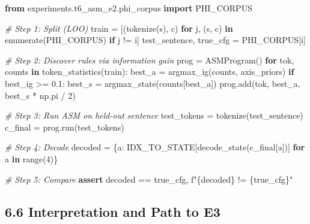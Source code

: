 \documentclass[
  twocolumn,
  10pt,
  a4paper]{article}
\newenvironment{Shaded}{}{}
\newcommand{\BuiltInTok}[1]{\textcolor[rgb]{0.00,0.50,0.00}{#1}}
\newcommand{\CommentTok}[1]{\textcolor[rgb]{0.38,0.63,0.69}{\textit{#1}}}
\newcommand{\ControlFlowTok}[1]{\textcolor[rgb]{0.00,0.44,0.13}{\textbf{#1}}}
\newcommand{\DecValTok}[1]{\textcolor[rgb]{0.25,0.63,0.44}{#1}}
\newcommand{\FloatTok}[1]{\textcolor[rgb]{0.25,0.63,0.44}{#1}}
\newcommand{\ImportTok}[1]{\textcolor[rgb]{0.00,0.50,0.00}{\textbf{#1}}}
\newcommand{\KeywordTok}[1]{\textcolor[rgb]{0.00,0.44,0.13}{\textbf{#1}}}
\newcommand{\NormalTok}[1]{#1}
\newcommand{\OperatorTok}[1]{\textcolor[rgb]{0.40,0.40,0.40}{#1}}
\newcommand{\SpecialCharTok}[1]{\textcolor[rgb]{0.25,0.44,0.63}{#1}}
\newcommand{\SpecialStringTok}[1]{\textcolor[rgb]{0.73,0.40,0.53}{#1}}
\begin{document}
\begin{Shaded}
\begin{Highlighting}[]
\ImportTok{from}\NormalTok{ experiments.t6\_asm\_e2.phi\_corpus }\ImportTok{import}\NormalTok{ PHI\_CORPUS}

\CommentTok{\# Step 1: Split (LOO)}
\NormalTok{train }\OperatorTok{=}\NormalTok{ [(tokenize(s), c) }\ControlFlowTok{for}\NormalTok{ j, (s, c) }\KeywordTok{in} \BuiltInTok{enumerate}\NormalTok{(PHI\_CORPUS) }\ControlFlowTok{if}\NormalTok{ j }\OperatorTok{!=}\NormalTok{ i]}
\NormalTok{test\_sentence, true\_cfg }\OperatorTok{=}\NormalTok{ PHI\_CORPUS[i]}

\CommentTok{\# Step 2: Discover rules via information gain}
\NormalTok{prog }\OperatorTok{=}\NormalTok{ ASMProgram()}
\ControlFlowTok{for}\NormalTok{ tok, counts }\KeywordTok{in}\NormalTok{ token\_statistics(train):}
\NormalTok{    best\_a }\OperatorTok{=}\NormalTok{ argmax\_ig(counts, axis\_priors)}
    \ControlFlowTok{if}\NormalTok{ best\_ig }\OperatorTok{\textgreater{}=} \FloatTok{0.1}\NormalTok{:}
\NormalTok{        best\_s }\OperatorTok{=}\NormalTok{ argmax\_state(counts[best\_a])}
\NormalTok{        prog.add(tok, best\_a, best\_s }\OperatorTok{*}\NormalTok{ np.pi }\OperatorTok{/} \DecValTok{2}\NormalTok{)}

\CommentTok{\# Step 3: Run ASM on held{-}out sentence}
\NormalTok{test\_tokens }\OperatorTok{=}\NormalTok{ tokenize(test\_sentence)}
\NormalTok{c\_final }\OperatorTok{=}\NormalTok{ prog.run(test\_tokens)}

\CommentTok{\# Step 4: Decode}
\NormalTok{decoded }\OperatorTok{=}\NormalTok{ \{a: IDX\_TO\_STATE[decode\_state(c\_final[a])] }\ControlFlowTok{for}\NormalTok{ a }\KeywordTok{in} \BuiltInTok{range}\NormalTok{(}\DecValTok{4}\NormalTok{)\}}

\CommentTok{\# Step 5: Compare}
\ControlFlowTok{assert}\NormalTok{ decoded }\OperatorTok{==}\NormalTok{ true\_cfg, }\SpecialStringTok{f"}\SpecialCharTok{\{}\NormalTok{decoded}\SpecialCharTok{\}}\SpecialStringTok{ != }\SpecialCharTok{\{}\NormalTok{true\_cfg}\SpecialCharTok{\}}\SpecialStringTok{"}
\end{Highlighting}
\end{Shaded}

\hypertarget{interpretation-and-path-to-e3}{%
\subsection{6.6 Interpretation and Path to
E3}\label{interpretation-and-path-to-e3}}
\end{document}
